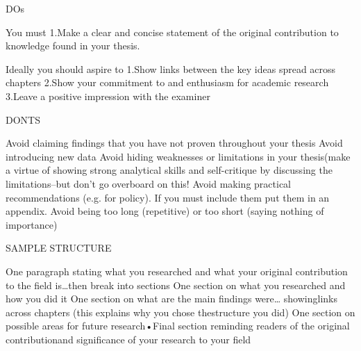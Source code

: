 DOs

You must 
1.Make a clear and concise statement of the original contribution to knowledge found in your thesis.

Ideally you should aspire to
1.Show links between the key ideas spread across chapters
2.Show your commitment to and enthusiasm for academic research
3.Leave a positive impression with the examiner


DONTS

Avoid claiming findings that you have not proven throughout your thesis
Avoid introducing new data
Avoid hiding weaknesses or limitations in your thesis(make a virtue of showing strong analytical skills and self-critique by discussing the limitations--but don't go overboard on this!
Avoid making practical recommendations (e.g. for policy). If you must include them put them in an appendix.
Avoid being too long (repetitive) or too short (saying nothing of importance)


SAMPLE STRUCTURE

One paragraph stating what you researched and what your original contribution to the field is…then break into sections
One section on what you researched and how you did it
One section on what are the main findings were… showinglinks across chapters (this explains why you chose thestructure you did)
One section on possible areas for future research•Final section reminding readers of the original contributionand significance of your research to your field